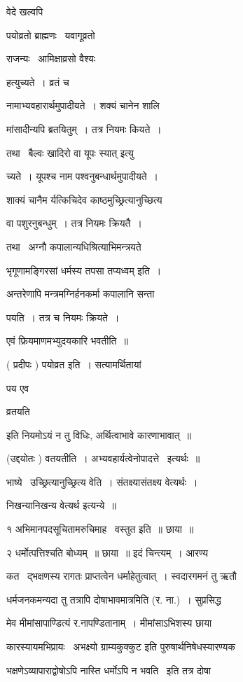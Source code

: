 \documentclass[11pt, openany]{book}
\begin{document}
वेदे खल्वपि \textendash\ {\qt पयोव्रतो ब्राह्मणः \textendash\ यवागूव्रतो 

राजन्यः \textendash\ आमिक्षाव्रसो वैश्यः} हत्युच्यते~। व्रतं च 

नामाभ्यवहारार्थमुपादीयते~। शक्यं चानेन शालि \textendash\ 

मांसादीन्यपि ब्रतयितुम्~। तत्र नियमः कियते~। 

तथा \textendash\ {\qt बैल्वः खादिरो वा यूपः स्यात्} इत्यु \textendash\ 

च्यते~। यूपश्च नाम पश्वनुबन्धार्थमुपादीयते~। 

शाक्यं चानैम र्यत्किचिदेव काष्ठमुच्छ्रित्यानुच्छित्य 

वा पशुरनुबन्धुम्~। तत्र नियमः क्रियतै~। 

तथा \textendash\ अग्नौ कपालान्यधिश्रित्याभिमन्त्रयते \textendash\ 

भृगूणामङ्गिरसां धर्मस्य तपसा तप्यध्वम् इति~। 

अन्तरेणापि मन्त्रमग्निर्हनकर्मा कपालानि सन्ता \textendash\ 

पयति~। तत्र च नियमः क्रियते~। 

एवं फ्रियमाणमभ्युदयकारि भवतीति~॥ 

( प्रदीपः ) पयोव्रत इति~। सत्यामर्थितायां {\qt पय एव 

व्रतयति} इति नियमोऽयं न तु विधिः, अर्थित्वाभावे कारणाभावात्~॥ 

(उद्दयोतः ) वतयतीति~। अभ्यवहार्यत्वेनोपादत्ते \textendash\ इत्यर्थः~॥ 

भाष्ये \textendash\ उच्छ्रित्यानुच्छ्रित्य वेति~। संतक्ष्यासंतक्ष्य वेत्यर्थः~। 

निखन्यानिखन्य वेत्यर्थ इत्यन्ये~॥ 



१ अभिमानपदसूचितामरुचिमाह \textendash\ वस्तुत इति~॥ छाया~॥ 

२ धर्मोत्पत्तिश्चति बोध्यम्~॥ छाया~॥ इदं चिन्त्यम्~। आरण्य \textendash\ 

कत \textendash\ द्भक्षणस्य रागतः प्राप्तत्वेन धर्माहेतुत्वात्~। स्वदारगमनं तु ऋतौ 

धर्मजनकमन्यदा तु तत्रापि दोषाभावमात्रमिति (र. ना.)~। सुप्रसिद्ध \textendash\ 

मेव मीमांसापाण्डित्यं र.नापण्डितानाम्~। मीमांसाऽभिशस्य छाया \textendash\ 

कारस्यायमभिप्रायः \textendash\ अभक्ष्यो ग्राम्यकुक्कुट इति पुरुषार्थनिषेधस्यारण्यक \textendash\ 


भक्षणेऽव्यापाराद्वोषोऽपि नास्ति धर्मोऽपि न भवति \textendash\ इति तत्र दोषा \textendash\ 
\end{document}
